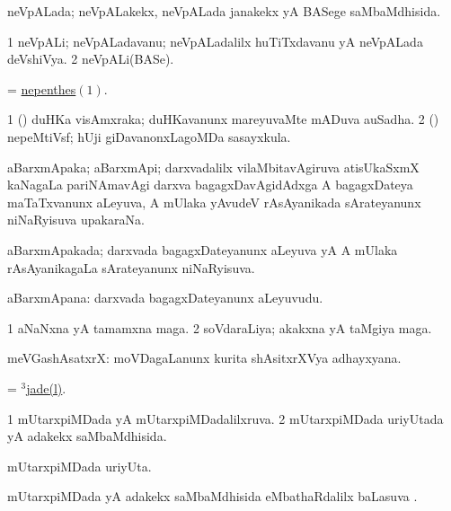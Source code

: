 \bentry
{}
\gl{\gu}
\bmng
neVpALada; neVpALakekx, neVpALada janakekx yA BASege saMbaMdhisida. 
\emng
\eentry

\bentry
{}
\gl{\nA}
\bmng
\bnum
\num{1} neVpALi; neVpALadavanu; neVpALadalilx huTiTxdavanu yA neVpALada deVshiVya. 
\num{2} neVpALi(BASe). 
\enum
\emng
\eentry

\bentry
{}
\gl{\nA}
\bmng
= \hyperlink{nepenthes}{nepenthes\((1)\)}. 
\emng
\eentry

\bentry
{}
\ga{\nA}\bmng
\bnum
\num{1} (\kAparx) duHKa visAmxraka; duHKavanunx mareyuvaMte mADuva auSadha. 
\num{2} (\savi) nepeMtiVsf; hUji giDavanonxLagoMDa sasayxkula. 
\enum
\emng
\eentry

\bentry
{}
\gl{\nA}
\bmng
aBarxmApaka; aBarxmApi; darxvadalilx vilaMbitavAgiruva atisUkaSxmX kaNagaLa pariNAmavAgi darxva bagagxDavAgidAdxga A bagagxDateya maTaTxvanunx aLeyuva, A mUlaka yAvudeV rAsAyanikada sArateyanunx niNaRyisuva upakaraNa. 
\emng
\eentry

\bentry
{}
\gl{\gu}
\bmng
aBarxmApakada; darxvada bagagxDateyanunx aLeyuva yA A mUlaka rAsAyanikagaLa sArateyanunx niNaRyisuva. 
\emng
\eentry

\bentry
{}
\gl{\nA}
\bmng
aBarxmApana: darxvada bagagxDateyanunx aLeyuvudu. 
\emng
\eentry

\bentry
{}
\gl{\nA}
\bmng
\bnum
\num{1} aNaNxna yA tamamxna maga. 
\num{2} soVdaraLiya; akakxna yA taMgiya maga. 
\enum
\emng
\eentry

\bentry
{}
\gl{\nA}
\bmng
meVGashAsatxrX: moVDagaLanunx kurita shAsitxrXVya adhayxyana. 
\emng
\eentry

\bentry
{}
\gl{\nA}
\bmng
 = \hyperref{kandict_j.pdf}{J}{jade(3)1}{$^3$jade(l)}. 
\emng
\eentry

\bentry
{}
\gl{\gu}
\bmng
\bnum
\num{1} mUtarxpiMDada yA mUtarxpiMDadalilxruva. 
\num{2} mUtarxpiMDada uriyUtada yA adakekx saMbaMdhisida. 
\enum
\emng
\eentry

\bentry
{}
\gl{\nA}
\bmng
mUtarxpiMDada uriyUta. 
\emng
\eentry

\bentry
{}
\gl{\sapUpa}
\bmng
mUtarxpiMDada yA adakekx saMbaMdhisida eMbathaRdalilx baLasuva \sapUpa. 
\emng
\eentry

